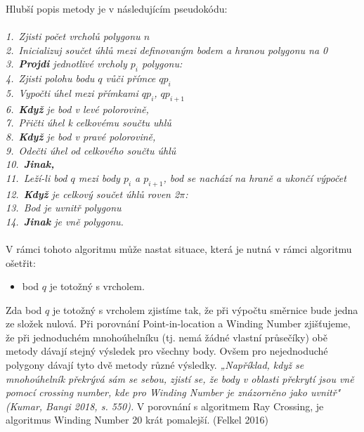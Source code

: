 \documentclass{article}
\begin{document}
Hlubší popis metody je v následujícím pseudokódu:\\
\vspace{0.2cm}\\
\indent\textit{{1.~}Zjisti počet vrcholů polygonu $n$}\\
\indent\textit{{2.~}Inicializuj součet úhlů mezi definovaným bodem a hranou polygonu na 0}\\
\indent\textit{{3.~}\textbf{Projdi} jednotlivé vrcholy $p_{i}$ polygonu:}\\
\indent\indent\textit{{4.~}Zjisti polohu bodu $q$ vůči přímce $qp_{i}$}\\
\indent\indent\textit{{5.~}Vypočti úhel mezi přímkami $qp_{i}$, $qp_{i+1}$}\\
\indent\indent\textit{{6.~}\textbf{Když} je bod v levé polorovině,}\\
\indent\indent\indent\textit{{7.~}Přičti úhel k celkovému součtu uhlů}\\
\indent\indent\textit{{8.~}\textbf{Když} je bod v pravé polorovině,}\\
\indent\indent\indent\textit{{9.~}Odečti úhel od celkového součtu úhlů}\\
\indent\indent\textit{{10.~}\textbf{Jinak,}}\\
\indent\indent\indent\textit{{11.~}Leží-li bod $q$ mezi body $p_{i}$ a $p_{i+1}$, bod se nachází na hraně a ukončí výpočet}\\
\indent\textit{{12.~}\textbf{Když} je celkový součet úhlů roven 2$\pi$:}\\
\indent\indent\textit{{13.~}Bod je uvnitř polygonu}\\
\indent\textit{{14.~}\textbf{Jinak} je vně polygonu.}\\
\vspace{0.2cm}\\
V rámci tohoto algoritmu může nastat situace, která je nutná v rámci algoritmu ošetřit:\begin{itemize}
    \item bod $q$ je totožný s vrcholem.
\end{itemize}
Zda bod $q$ je totožný s vrcholem zjistíme tak, že při výpočtu směrnice bude jedna ze složek nulová.
Při porovnání Point-in-location a Winding Number zjišťujeme, že při jednoduchém mnohoúhelníku (tj. nemá žádné vlastní průsečíky) obě metody dávají stejný výsledek pro všechny body. Ovšem pro nejednoduché polygony dávají tyto dvě metody různé výsledky. \textit{„Například, když se mnohoúhelník překrývá sám se sebou, zjistí se, že body v oblasti překrytí jsou vně pomocí crossing number, kde pro Winding Number je znázorněno jako uvnitř" (Kumar, Bangi 2018, s. 550).} V porovnání s algoritmem Ray Crossing, je algoritmus Winding Number 20 krát pomalejší. (Felkel 2016)
\end{document}
